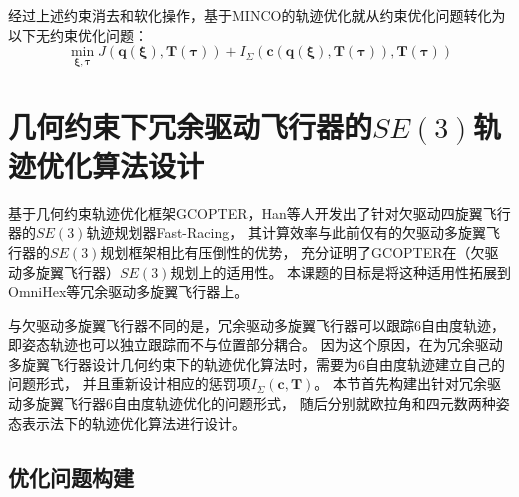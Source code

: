 经过上述约束消去和软化操作，基于MINCO的轨迹优化就从约束优化问题转化为以下无约束优化问题：
\begin{equation}
  \min_{\bm{\xi}, \bm{\tau}}
  J(\bm{q}(\bm{\xi}), \bm{T}(\bm{\tau})) + 
  I_{\Sigma}(\bm{c}(\bm{q}(\bm{\xi}), \bm{T}(\bm{\tau})), \bm{T}(\bm{\tau}))
  \label{equ:final_unconstrained_optimization_problem}
\end{equation}

\section{几何约束下冗余驱动飞行器的$SE(3)$轨迹优化算法设计} \label{sec:geometrically_constrained_SE3_planning_for_omnihex}
基于几何约束轨迹优化框架GCOPTER，Han等人开发出了针对欠驱动四旋翼飞行器的$SE(3)$轨迹规划器Fast-Racing\cite{han2021fast}，
其计算效率与此前仅有的欠驱动多旋翼飞行器的$SE(3)$规划框架\cite{liu2018search}相比有压倒性的优势，
充分证明了GCOPTER在（欠驱动多旋翼飞行器）$SE(3)$规划上的适用性。
本课题的目标是将这种适用性拓展到OmniHex等冗余驱动多旋翼飞行器上。

与欠驱动多旋翼飞行器不同的是，冗余驱动多旋翼飞行器可以跟踪6自由度轨迹，即姿态轨迹也可以独立跟踪而不与位置部分耦合。
因为这个原因，在为冗余驱动多旋翼飞行器设计几何约束下的轨迹优化算法时，需要为6自由度轨迹建立自己的问题形式，
并且重新设计相应的惩罚项$I_{\Sigma}(\bm{c}, \bm{T})$。
本节首先构建出针对冗余驱动多旋翼飞行器6自由度轨迹优化的问题形式，
随后分别就欧拉角和四元数两种姿态表示法下的轨迹优化算法进行设计。

\subsection{优化问题构建}\label{subsec:problem_setup}
